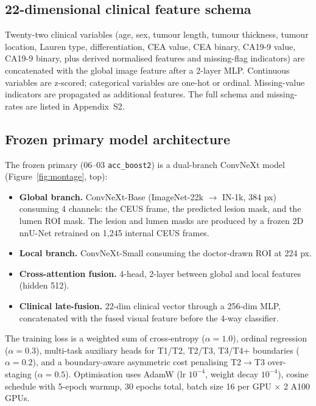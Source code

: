 \documentclass[11pt,a4paper]{article}
\begin{document}
\subsection{22-dimensional clinical feature schema}

Twenty-two clinical variables (age, sex, tumour length, tumour thickness, tumour location, Lauren type, differentiation, CEA value, CEA binary, CA19-9 value, CA19-9 binary, plus derived normalised features and missing-flag indicators) are concatenated with the global image feature after a 2-layer MLP. Continuous variables are z-scored; categorical variables are one-hot or ordinal. Missing-value indicators are propagated as additional features. The full schema and missing-rates are listed in Appendix~S2.

\subsection{Frozen primary model architecture}

The frozen primary (06--03 \texttt{acc\_boost2}) is a dual-branch ConvNeXt model (Figure~\ref{fig:montage}, top):
\begin{itemize}[leftmargin=*]
\item \textbf{Global branch.} ConvNeXt-Base (ImageNet-22k $\to$ IN-1k, 384 px) consuming 4 channels: the CEUS frame, the predicted lesion mask, and the lumen ROI mask. The lesion and lumen masks are produced by a frozen 2D nnU-Net \cite{isensee2020nnunet} retrained on 1{,}245 internal CEUS frames.
\item \textbf{Local branch.} ConvNeXt-Small consuming the doctor-drawn ROI at 224 px.
\item \textbf{Cross-attention fusion.} 4-head, 2-layer between global and local features (hidden 512).
\item \textbf{Clinical late-fusion.} 22-dim clinical vector through a 256-dim MLP, concatenated with the fused visual feature before the 4-way classifier.
\end{itemize}

The training loss is a weighted sum of cross-entropy ($\alpha=1.0$), ordinal regression ($\alpha=0.3$), multi-task auxiliary heads for T1/T2, T2/T3, T3/T4+ boundaries ($\alpha=0.2$), and a boundary-aware asymmetric cost penalising T2$\to$T3 over-staging ($\alpha=0.5$). Optimisation uses AdamW (lr $10^{-4}$, weight decay $10^{-4}$), cosine schedule with 5-epoch warmup, 30 epochs total, batch size 16 per GPU $\times$ 2 A100 GPUs.
\end{document}

